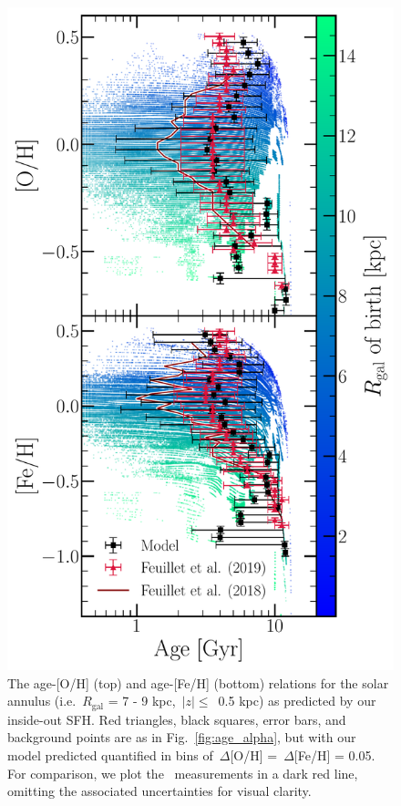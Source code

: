 \documentclass[fleqn, usenatbib]{mnras}
\begin{document}
\begin{figure} 
\centering 
\includegraphics[scale = 0.45]{amr_solar_annulus.pdf} 
\caption{The age-[O/H] (top) and age-[Fe/H] (bottom) relations for the solar 
annulus (i.e.~$R_\text{gal}$ = 7 - 9 kpc,~$\left|z\right|\leq$~0.5 kpc) as 
predicted by our inside-out SFH. Red triangles, black squares, error bars, and 
background points are as in Fig.~\ref{fig:age_alpha}, but with our model 
predicted quantified in bins of~$\Delta$[O/H] =~$\Delta$[Fe/H] = 0.05. For 
comparison, we plot the~\citet{Feuillet2018} measurements in a dark red line, 
omitting the associated uncertainties for visual clarity. } 
\label{fig:amr_solar_annulus} 
\end{figure} 
\end{document}
